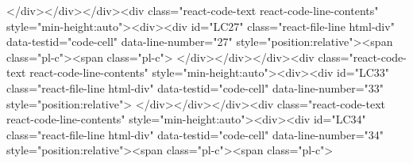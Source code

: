 {{{{{{{{{{{{{{{{{{{{{{{{{{{{{{{</div></div></div><div class="react-code-text react-code-line-contents" style="min-height:auto"><div><div id="LC27" class="react-file-line html-div" data-testid="code-cell" data-line-number="27" style="position:relative"><span class="pl-c"><span class="pl-c">%
</div></div></div><div class="react-code-text react-code-line-contents" style="min-height:auto"><div><div id="LC33" class="react-file-line html-div" data-testid="code-cell" data-line-number="33" style="position:relative">
</div></div></div><div class="react-code-text react-code-line-contents" style="min-height:auto"><div><div id="LC34" class="react-file-line html-div" data-testid="code-cell" data-line-number="34" style="position:relative"><span class="pl-c"><span class="pl-c">%
}}}}}}}}}}}}}}}}}}}}}}}}}}}}}}}
